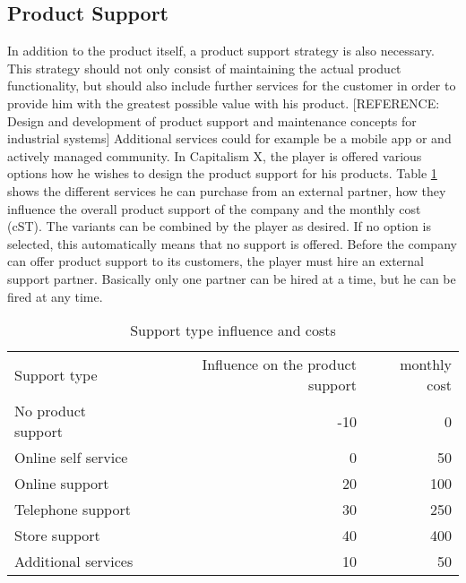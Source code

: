 \subsection{Product Support}  \label{product_support_simulation}


In addition to the product itself, a product support strategy is also necessary. This strategy should not only consist of maintaining the actual product functionality, but should also include further services for the customer in order to provide him with the greatest possible value with his product. [REFERENCE: Design and development of product support and maintenance concepts for industrial systems] Additional services could for example be a mobile app or and actively managed community.  
In Capitalism X, the player is offered various options how he wishes to design the product support for his products. Table \ref{Support_types} shows the different services he can purchase from an external partner, how they influence the overall product support of the company and the monthly cost (\gls{cST}). The variants can be combined by the player as desired. If no option is selected, this automatically means that no support is offered.
Before the company can offer product support to its customers, the player must hire an external support partner. Basically only one partner can be hired at a time, but he can be fired at any time.

\begin{table}[ht]
    \centering
    \begin{tabular}{|l|r|r|}
    \hline
    Support type & Influence on the product support & monthly cost \\
    No product support   & -10   & 0    \\
    Online self service  & 0     & 50   \\
    Online support       & 20    & 100  \\
    Telephone support    & 30    & 250  \\
    Store support        & 40    & 400  \\
    Additional services  & 10    & 50   \\     
    \hline
    \end{tabular}
    \caption{Support type influence and costs}
    \label{Support_types}
\end{table}


